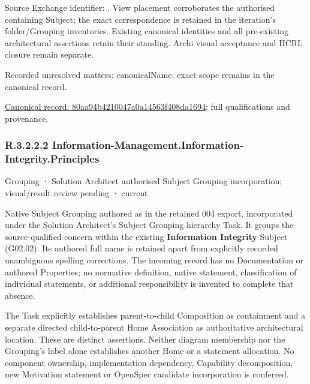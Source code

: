 Source Exchange identifier: \texttt{}. View placement corroborates
the authorised containing Subject; the exact correspondence is retained in the
iteration's folder/Grouping inventories. Existing canonical identities and all
pre-existing architectural assertions retain their standing. Archi visual
acceptance and HCRL closure remain separate.


{\small Recorded unresolved matters: canonicalName; exact scope remains in the canonical record.}\par
{\footnotesize \href{../../../../continuum/grouping/80aa94b4210047a0a14563f408da1694.md}{Canonical record: 80aa94b4210047a0a14563f408da1694}; full qualifications and provenance.}\par
\subsubsection*{R.3.2.2.2 Information-Management.Information-Integrity.Principles}
\label{navigation:R.3.2.2.2}

\label{element:88d1c3fd640448c2b35933d2b03b8151}
{\small Grouping · Solution Architect authorised Subject Grouping incorporation; visual/result review pending · current}\par

Native Subject Grouping authored as \texttt{} in the retained 004 export,
incorporated under the Solution Architect's Subject Grouping hierarchy Task.
It groups the source-qualified \texttt{} concern within
the existing \textbf{Information Integrity} Subject (G02.02). Its authored full name
is retained apart from explicitly recorded unambiguous spelling corrections.
The incoming record has no Documentation or authored Properties; no normative
definition, native statement, classification of individual statements, or
additional responsibility is invented to complete that absence.



The Task explicitly establishes parent-to-child Composition as containment and
a separate directed child-to-parent Home Association as authoritative architectural
location. These are distinct assertions. Neither diagram membership nor the
Grouping's label alone establishes another Home or a statement allocation.
No component ownership, implementation dependency, Capability decomposition,
new Motivation statement or OpenSpec candidate incorporation is conferred.



